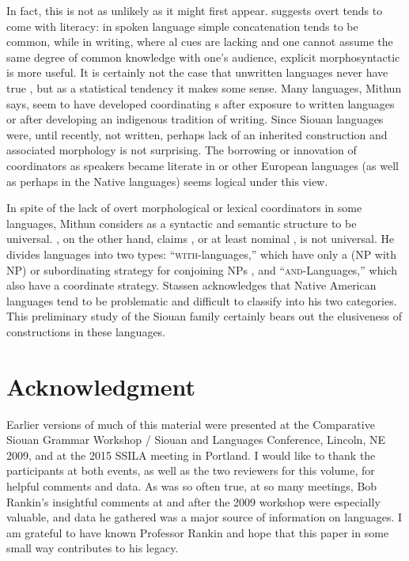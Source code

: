 \documentclass[output=paper]{LSP/langsci}
\begin{document}
In fact, this is not as unlikely as it might first appear. \citet{Mithun1988} suggests overt  tends to come with literacy: in spoken language simple concatenation tends to be common, while in writing, where al cues are lacking and one cannot assume the same degree of common knowledge with one's audience, explicit morphosyntactic  is more useful. It is certainly not the case that unwritten languages never have true , but as a statistical tendency it makes some sense. Many languages, Mithun says, seem to have developed coordinating s after exposure to written languages or after developing an indigenous tradition of writing. Since Siouan languages were, until recently, not written, perhaps lack of an inherited  construction and associated morphology is not surprising. The borrowing or innovation of coordinators as speakers became literate in  or other European languages (as well as perhaps in the Native languages) seems logical under this view.

In spite of the lack of overt morphological or lexical coordinators in some languages, Mithun considers  as a syntactic and semantic structure to be universal. \citet{Stassen2000}, on the other hand, claims , or at least nominal , is not universal. He divides languages into two types: ``\textsc{with}-languages,'' which have only a  (NP with NP) or subordinating strategy for conjoining NPs , and ``\textsc{and}-Languages,'' which also have a coordinate strategy. Stassen acknowledges that Native American languages tend to be problematic and difficult to classify into his two categories. This preliminary study of the Siouan family certainly bears out the elusiveness of  constructions in these languages.

\section*{Acknowledgment}

Earlier versions of much of this material were presented at the Comparative Siouan Grammar Workshop / Siouan and  Languages Conference, Lincoln, NE 2009, and at the 2015 SSILA meeting in Portland. I would like to thank the participants at both events, as well as the two reviewers for this volume, for helpful comments and data. As was so often true, at so many meetings, Bob Rankin's insightful comments at and after the 2009 workshop were especially valuable, and data he gathered was a major source of information on  languages. I am grateful to have known Professor Rankin and hope that this paper in some small way contributes to his legacy.
\end{document}
